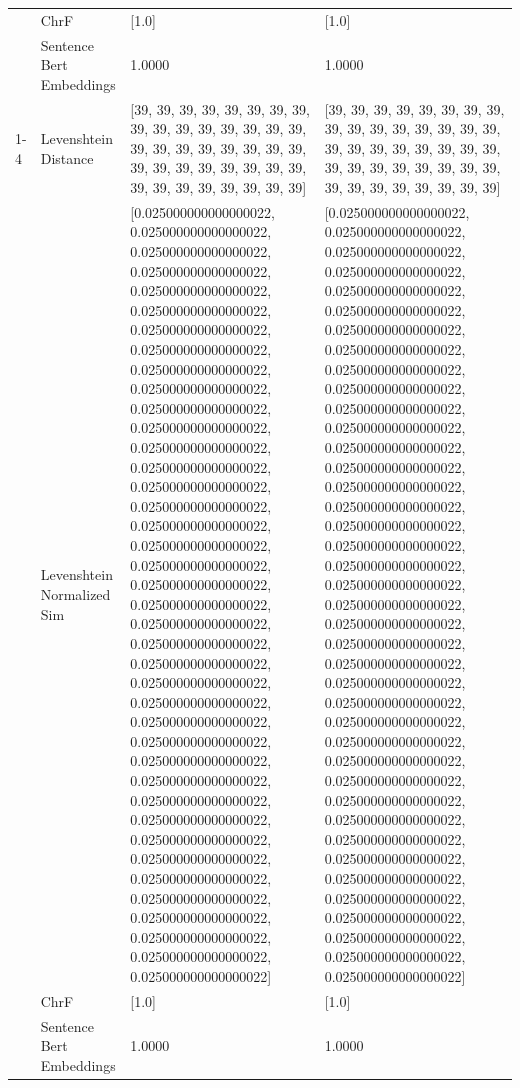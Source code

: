 \begin{tabular}{llll}
 & ChrF & [1.0] & [1.0] \\
 & Sentence Bert Embeddings & 1.0000 & 1.0000 \\
\cline{1-4}
\multirow[t]{4}{*}{Omosacha togocha engencho ye'rigesa.} & Levenshtein Distance & [39, 39, 39, 39, 39, 39, 39, 39, 39, 39, 39, 39, 39, 39, 39, 39, 39, 39, 39, 39, 39, 39, 39, 39, 39, 39, 39, 39, 39, 39, 39, 39, 39, 39, 39, 39, 39, 39, 39, 39] & [39, 39, 39, 39, 39, 39, 39, 39, 39, 39, 39, 39, 39, 39, 39, 39, 39, 39, 39, 39, 39, 39, 39, 39, 39, 39, 39, 39, 39, 39, 39, 39, 39, 39, 39, 39, 39, 39, 39, 39] \\
 & Levenshtein Normalized Sim & [0.025000000000000022, 0.025000000000000022, 0.025000000000000022, 0.025000000000000022, 0.025000000000000022, 0.025000000000000022, 0.025000000000000022, 0.025000000000000022, 0.025000000000000022, 0.025000000000000022, 0.025000000000000022, 0.025000000000000022, 0.025000000000000022, 0.025000000000000022, 0.025000000000000022, 0.025000000000000022, 0.025000000000000022, 0.025000000000000022, 0.025000000000000022, 0.025000000000000022, 0.025000000000000022, 0.025000000000000022, 0.025000000000000022, 0.025000000000000022, 0.025000000000000022, 0.025000000000000022, 0.025000000000000022, 0.025000000000000022, 0.025000000000000022, 0.025000000000000022, 0.025000000000000022, 0.025000000000000022, 0.025000000000000022, 0.025000000000000022, 0.025000000000000022, 0.025000000000000022, 0.025000000000000022, 0.025000000000000022, 0.025000000000000022, 0.025000000000000022] & [0.025000000000000022, 0.025000000000000022, 0.025000000000000022, 0.025000000000000022, 0.025000000000000022, 0.025000000000000022, 0.025000000000000022, 0.025000000000000022, 0.025000000000000022, 0.025000000000000022, 0.025000000000000022, 0.025000000000000022, 0.025000000000000022, 0.025000000000000022, 0.025000000000000022, 0.025000000000000022, 0.025000000000000022, 0.025000000000000022, 0.025000000000000022, 0.025000000000000022, 0.025000000000000022, 0.025000000000000022, 0.025000000000000022, 0.025000000000000022, 0.025000000000000022, 0.025000000000000022, 0.025000000000000022, 0.025000000000000022, 0.025000000000000022, 0.025000000000000022, 0.025000000000000022, 0.025000000000000022, 0.025000000000000022, 0.025000000000000022, 0.025000000000000022, 0.025000000000000022, 0.025000000000000022, 0.025000000000000022, 0.025000000000000022, 0.025000000000000022] \\
 & ChrF & [1.0] & [1.0] \\
 & Sentence Bert Embeddings & 1.0000 & 1.0000 \\

\end{tabular}
